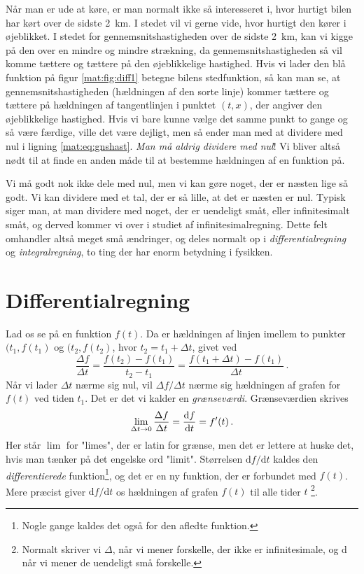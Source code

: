 Når man er ude at køre, er man normalt ikke så interesseret i, hvor hurtigt bilen har kørt over de sidste \SI{2}{km}. I stedet vil vi gerne vide, hvor hurtigt den kører i øjeblikket. I stedet for gennemsnitshastigheden over de sidste \SI{2}{km}, kan vi kigge på den over en mindre og mindre strækning, da gennemsnitshastigheden så vil komme tættere og tættere på den øjeblikkelige hastighed. Hvis vi lader den blå funktion på figur \ref{mat:fig:diff1} betegne bilens stedfunktion, så kan man se, at gennemsnitshastigheden (hældningen af den sorte linje) kommer tættere og tættere på hældningen af tangentlinjen i punktet $(t,x)$, der angiver den øjeblikkelige hastighed.  
Hvis vi bare kunne vælge det samme punkt to gange og så være færdige, ville det være dejligt, men så ender man med at dividere med nul i ligning \eqref{mat:eq:gnshast}. \emph{Man må aldrig dividere med nul}! Vi bliver altså nødt til at finde en anden måde til at bestemme hældningen af en funktion på. 

Vi må godt nok ikke dele med nul, men  vi kan gøre noget, der er næsten lige så godt. Vi kan dividere med et tal, der er så lille, at det er næsten er nul. Typisk siger man, at man dividere med noget, der er uendeligt småt, eller infinitesimalt småt, og derved kommer vi over i studiet af infinitesimalregning. Dette felt omhandler altså meget små ændringer, og deles normalt op i \emph{differentialregning} og \emph{integralregning}, to ting der har enorm betydning i fysikken.

\section{Differentialregning}
Lad os se på en funktion $f(t)$. Da er hældningen af linjen imellem to punkter $(t_1,f(t_1)$ og $(t_2,f(t_2)$, hvor $t_2 = t_1 + \Delta t$, givet ved
$$
\frac{\Delta f}{\Delta t}=\frac{f(t_2)-f(t_1)}{t_2-t_1}=\frac{f(t_1+\Delta t)-f(t_1)}{\Delta t} \, .
$$
Når vi lader $\Delta t$ nærme sig nul, vil $\Delta f/ \Delta t$ nærme sig hældningen af grafen for $f(t)$ ved tiden $t_1$. Det er det vi kalder en \emph{grænseværdi}. Grænseværdien skrives
\begin{equation} \label{mat:eq:diffkvotient}
\lim_{\Delta t\rightarrow 0}\frac{\Delta f}{\Delta t}=\dv{f}{t}=f'(t) \, .
\end{equation}
Her står $\lim$ for "limes", der er latin for grænse, men det er lettere at huske det, hvis man tænker på det engelske ord "limit". Størrelsen $\text{d}f / \text{d}t$ kaldes den \emph{differentierede} funktion\footnote{Nogle gange kaldes det også for den afledte funktion.}, og det er en ny funktion, der er forbundet med $f(t)$. Mere præcist giver $\text{d}f / \text{d}t$ os hældningen af grafen $f(t)$ til alle tider $t$ 
\footnote{Normalt skriver vi $\Delta$, når vi mener forskelle, der ikke er infinitesimale, og d når vi mener de uendeligt små forskelle.}.

